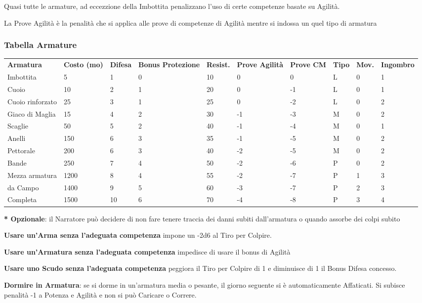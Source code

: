\documentclass[a4paper,11pt,twoside,openany]{book}
\begin{document}
Quasi tutte le armature, ad eccezzione della Imbottita penalizzano l'uso di certe competenze basate su Agilità.

La Prove Agilità è la penalità che si applica alle prove di competenze di Agilità mentre si indossa un quel tipo di armatura

\subsubsection{Tabella Armature}
\medskip

\label{tabella-armature}
\begin{tabularx}{\textwidth}{lXXXXXXXXX}
	\toprule
	\textbf{Armatura} & \textbf{Costo (mo)} & \textbf{Difesa} & \textbf{Bonus Protezione } & \textbf{Resist.} & \textbf{Prove Agilità} & \textbf{Prove CM} & \textbf{Tipo} & \textbf{Mov.} & \textbf{Ingombro}\tabularnewline
	Imbottita    & 5    & 1& 0 & 10   & 0   & 0  & L   & 0   & 1\tabularnewline
	Cuoio   & 10   & 2& 1 & 20   & 0   & -1 & L   & 0   & 1\tabularnewline
	Cuoio rinforzato  & 25   & 3& 1 & 25   & 0   & -2 & L   & 0   & 2\tabularnewline
	Giaco di Maglia   & 15   & 4& 2 & 30   & -1  & -3 & M   & 0   & 2\tabularnewline
	Scaglie & 50   & 5& 2 & 40   & -1  & -4 & M   & 0   & 1\tabularnewline
	Anelli  & 150  & 6& 3 & 35   & -1  & -5 & M   & 0   & 2\tabularnewline
	Pettorale    & 200  & 6& 3 & 40   & -2  & -5 & M   & 0   & 2\tabularnewline
	Bande   & 250  & 7& 4 & 50   & -2  & -6 & P   & 0   & 2\tabularnewline
	Mezza armatura    & 1200 & 8& 4 & 55   & -2  & -7 & P   & 1   & 3\tabularnewline
	da Campo& 1400 & 9& 5 & 60   & -3  & -7 & P   & 2   & 3\tabularnewline
	Completa& 1500 & 10    & 6 & 70   & -4  & -8 & P   & 3   & 4\tabularnewline
\end{tabularx}

\textbf{{*} Opzionale}: il Narratore può decidere di non fare tenere traccia dei danni subiti dall'armatura o quando assorbe dei colpi subito

\bigskip

\textbf{Usare un'Arma senza l'adeguata competenza} impone un -2d6 al Tiro per Colpire.

\textbf{Usare un'Armatura senza l'adeguata competenza} impedisce di usare il bonus di Agilità

\textbf{Usare uno Scudo senza l'adeguata competenza} peggiora il Tiro per Colpire di 1 e diminuisce di 1 il Bonus Difesa concesso.

\textbf{Dormire in Armatura}: se si dorme in un'armatura media o pesante, il giorno seguente si è automaticamente Affaticati. Si subisce penalità -1 a Potenza e Agilità e non si può Caricare o Correre.
\end{document}
